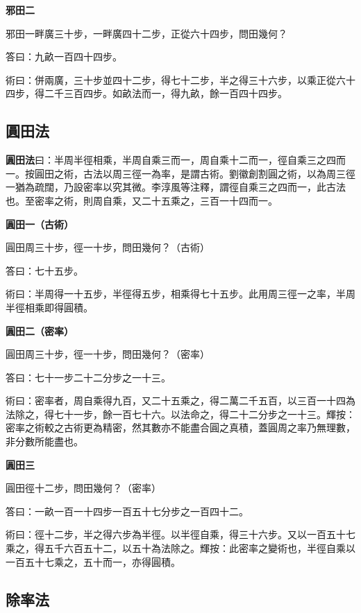 \documentclass[11pt,a4paper]{article}
\newenvironment{problemenv}[1]{%
  \medskip\noindent\textbf{#1}\par\nopagebreak\smallskip
}{\medskip}
\begin{document}
\begin{problemenv}{邪田二}
邪田一畔廣三十步，一畔廣四十二步，正從六十四步，問田幾何？

\textsf{答曰：}九畝一百四十四步。

\textsf{術曰：}併兩廣，三十步並四十二步，得七十二步，半之得三十六步，以乘正從六十四步，得二千三百四步。如畝法而一，得九畝，餘一百四十四步。
\end{problemenv}

\subsection{圓田法}

\textbf{圓田法}曰：半周半徑相乘，半周自乘三而一，周自乘十二而一，徑自乘三之四而一。按圓田之術，古法以周三徑一為率，是謂古術。劉徽創割圓之術，以為周三徑一猶為疏闊，乃設密率以究其微。李淳風等注釋，謂徑自乘三之四而一，此古法也。至密率之術，則周自乘，又二十五乘之，三百一十四而一。

\begin{problemenv}{圓田一（古術）}
圓田周三十步，徑一十步，問田幾何？（古術）

\textsf{答曰：}七十五步。

\textsf{術曰：}半周得一十五步，半徑得五步，相乘得七十五步。此用周三徑一之率，半周半徑相乘即得圓積。
\end{problemenv}

\begin{problemenv}{圓田二（密率）}
圓田周三十步，徑一十步，問田幾何？（密率）

\textsf{答曰：}七十一步二十二分步之一十三。

\textsf{術曰：}密率者，周自乘得九百，又二十五乘之，得二萬二千五百，以三百一十四為法除之，得七十一步，餘一百七十六。以法命之，得二十二分步之一十三。輝按：密率之術較之古術更為精密，然其數亦不能盡合圓之真積，蓋圓周之率乃無理數，非分數所能盡也。
\end{problemenv}

\begin{problemenv}{圓田三}
圓田徑十二步，問田幾何？（密率）

\textsf{答曰：}一畝一百一十四步一百五十七分步之一百四十二。

\textsf{術曰：}徑十二步，半之得六步為半徑。以半徑自乘，得三十六步。又以一百五十七乘之，得五千六百五十二，以五十為法除之。輝按：此密率之變術也，半徑自乘以一百五十七乘之，五十而一，亦得圓積。
\end{problemenv}

\subsection{除率法}
\end{document}
